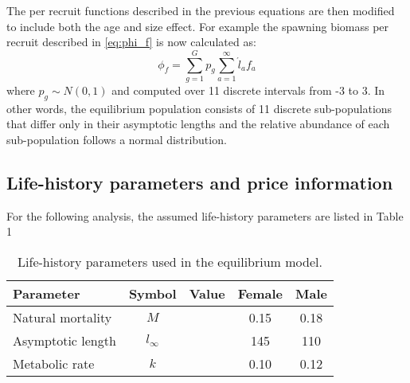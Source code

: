 The per recruit functions described in the previous equations are then modified to include both the age and size effect.  For example the spawning biomass per recruit described in \eqref{eq:phi_f} is now calculated as:
\begin{equation}
	\phi_{f} =\sum_{g=1}^G p_g \sum_{a=1}^\infty \acute{l}_a f_a\label{eq:phi_fg}
\end{equation}
where $p_g \sim N(0,1)$ and computed over 11 discrete intervals from -3 to 3.  In other words, the equilibrium population consists of 11 discrete sub-populations that differ only in their asymptotic lengths and the relative abundance of each sub-population follows a normal distribution.

\subsection{Life-history parameters and price information} %
\label{sub:life_history_parameters_and_price_information}
For the following analysis, the assumed life-history parameters are listed in Table 1

\begin{table}
	\caption{Life-history parameters used in the equilibrium model.}
	\label{table:Life_history_pars}
	\begin{center}
	\begin{tabular}{lcccc}
		\hline
		Parameter         & Symbol     & Value & Female & Male \\
		\hline
		Natural mortality & $M$        &       &   0.15 & 0.18 \\
		Asymptotic length & $l_\infty$ &       &   145  & 110  \\
		Metabolic rate    & $k$        &       &   0.10 & 0.12 \\
		\hline
		
	\end{tabular}
	\end{center}
\end{table}





